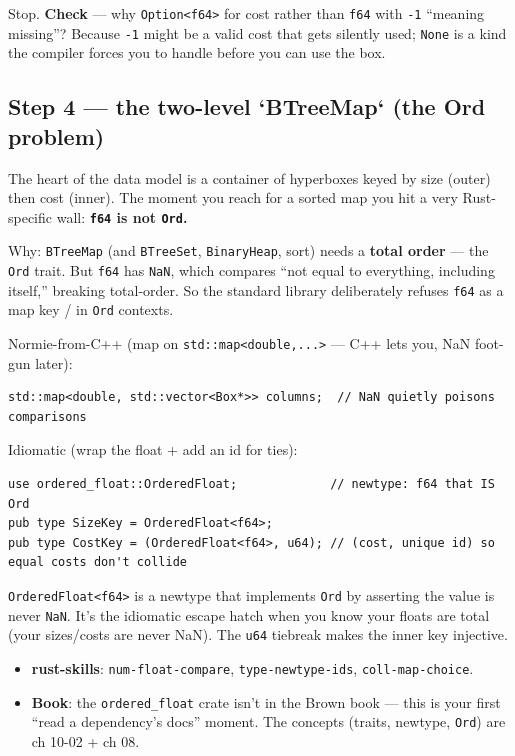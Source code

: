 \documentclass[11pt]{article}
\begin{document}
Stop. \textbf{\textbf{Check}} — why \texttt{Option<f64>} for cost rather than \texttt{f64} with \texttt{-1}
``meaning missing''? Because \texttt{-1} might be a valid cost that gets silently used;
\texttt{None} is a kind the compiler forces you to handle before you can use the box.
\subsection{Step 4 — the two-level `BTreeMap` (the Ord problem)}
\label{sec:org12c6f45}

The heart of the data model is a container of hyperboxes keyed by size (outer)
then cost (inner). The moment you reach for a sorted map you hit a very
Rust-specific wall: \textbf{\textbf{\texttt{f64} is not \texttt{Ord}.}}

Why: \texttt{BTreeMap} (and \texttt{BTreeSet}, \texttt{BinaryHeap}, sort) needs a \textbf{total order} — the
\texttt{Ord} trait. But \texttt{f64} has \texttt{NaN}, which compares ``not equal to everything,
including itself,'' breaking total-order. So the standard library deliberately
refuses \texttt{f64} as a map key / in \texttt{Ord} contexts.

Normie-from-C++ (map on \texttt{std::map<double,...>} — C++ lets you, NaN foot-gun
later):
\begin{verbatim}
std::map<double, std::vector<Box*>> columns;  // NaN quietly poisons comparisons
\end{verbatim}

Idiomatic (wrap the float + add an id for ties):
\begin{verbatim}
use ordered_float::OrderedFloat;             // newtype: f64 that IS Ord
pub type SizeKey = OrderedFloat<f64>;
pub type CostKey = (OrderedFloat<f64>, u64); // (cost, unique id) so equal costs don't collide
\end{verbatim}

\texttt{OrderedFloat<f64>} is a newtype that implements \texttt{Ord} by asserting the value is
never \texttt{NaN}. It's the idiomatic escape hatch when you know your floats are total
(your sizes/costs are never NaN). The \texttt{u64} tiebreak makes the inner key injective.

\begin{itemize}
\item \textbf{\textbf{rust-skills}}: \texttt{num-float-compare}, \texttt{type-newtype-ids}, \texttt{coll-map-choice}.
\item \textbf{\textbf{Book}}: the \texttt{ordered\_float} crate isn't in the Brown book — this is your
first ``read a dependency's docs'' moment. The concepts (traits, newtype, \texttt{Ord})
are ch 10-02 + ch 08.
\end{itemize}
\end{document}
